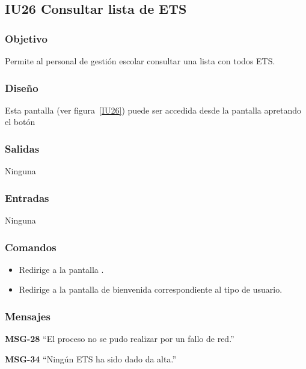 
\subsection{IU26 Consultar lista de ETS}
\subsubsection{Objetivo}
    Permite al personal de gestión escolar consultar una lista con todos ETS.
\subsubsection{Diseño}
    Esta pantalla  (ver figura~\ref{IU26}) puede ser accedida desde la pantalla  apretando el botón 

\subsubsection{Salidas}
Ninguna
\subsubsection{Entradas}
Ninguna
\subsubsection{Comandos}
\begin{itemize}
    \item {} Redirige a la pantalla .
    \item {} Redirige a la pantalla de bienvenida correspondiente al tipo de usuario.
    
\end{itemize}

\subsubsection{Mensajes}

\begin{Citemize}
    \item {\bf MSG-28}  ``El proceso no se pudo realizar por un fallo de red.''
    \item {\bf MSG-34}  ``Ningún ETS ha sido dado da alta.''
\end{Citemize}

